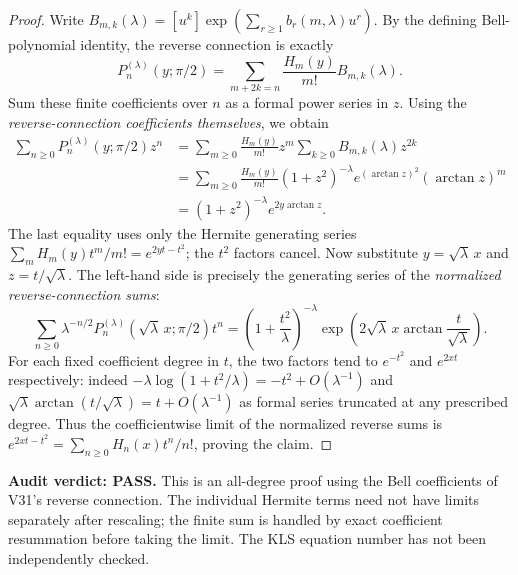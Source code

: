 \documentclass[11pt]{article}
\begin{document}
\begin{proof}
Write $B_{m,k}(\lambda)=[u^k]\exp(\sum_{r\ge1}b_r(m,\lambda)u^r)$.
By the defining Bell-polynomial identity, the reverse connection is exactly
\[
P_n^{(\lambda)}(y;\pi/2)=
\sum_{m+2k=n}\frac{H_m(y)}{m!}B_{m,k}(\lambda).
\]
Sum these finite coefficients over $n$ as a formal power series in $z$.
Using the \emph{reverse-connection coefficients themselves}, we obtain
\begin{align*}
\sum_{n\ge0}P_n^{(\lambda)}(y;\pi/2)z^n
&=\sum_{m\ge0}\frac{H_m(y)}{m!}z^m
\sum_{k\ge0}B_{m,k}(\lambda)z^{2k}\\
&=\sum_{m\ge0}\frac{H_m(y)}{m!}
(1+z^2)^{-\lambda}e^{(\arctan z)^2}(\arctan z)^m\\
&=(1+z^2)^{-\lambda}e^{2y\arctan z}.
\end{align*}
The last equality uses only the Hermite generating series
$\sum_mH_m(y)t^m/m!=e^{2yt-t^2}$; the $t^2$ factors cancel.
Now substitute $y=\sqrt\lambda\,x$ and $z=t/\sqrt\lambda$.
The left-hand side is precisely the generating series of the
\emph{normalized reverse-connection sums}:
\[
\sum_{n\ge0}\lambda^{-n/2}P_n^{(\lambda)}(\sqrt\lambda\,x;\pi/2)t^n
=\left(1+\frac{t^2}{\lambda}\right)^{-\lambda}
\exp\left(2\sqrt\lambda\,x\arctan\frac{t}{\sqrt\lambda}\right).
\]
For each fixed coefficient degree in $t$, the two factors tend to
$e^{-t^2}$ and $e^{2xt}$ respectively: indeed
$-\lambda\log(1+t^2/\lambda)=-t^2+O(\lambda^{-1})$
and $\sqrt\lambda\arctan(t/\sqrt\lambda)=t+O(\lambda^{-1})$
as formal series truncated at any prescribed degree.
Thus the coefficientwise limit of the normalized reverse sums is
$e^{2xt-t^2}=\sum_{n\ge0}H_n(x)t^n/n!$, proving the claim.
\end{proof}
\noindent\textbf{Audit verdict: PASS.} This is an all-degree proof using the
Bell coefficients of V31's reverse connection. The individual Hermite
terms need not have limits separately after rescaling; the finite sum
is handled by exact coefficient resummation before taking the limit.
The KLS equation number has not been independently checked.
\end{document}
